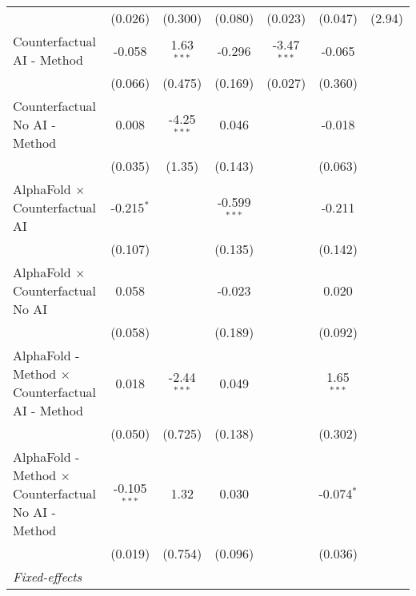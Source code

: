 \begin{tabular}{lcccccc}
                                                              & (0.026)        & (0.300)       & (0.080)        & (0.023)        & (0.047)      & (2.94)\\   
   Counterfactual AI - Method                                 & -0.058         & 1.63$^{***}$  & -0.296         & -3.47$^{***}$  & -0.065       &   \\   
                                                              & (0.066)        & (0.475)       & (0.169)        & (0.027)        & (0.360)      &   \\   
   Counterfactual No AI - Method                              & 0.008          & -4.25$^{***}$ & 0.046          &                & -0.018       &   \\   
                                                              & (0.035)        & (1.35)        & (0.143)        &                & (0.063)      &   \\   
   AlphaFold $\times$ Counterfactual AI                       & -0.215$^{*}$   &               & -0.599$^{***}$ &                & -0.211       &   \\   
                                                              & (0.107)        &               & (0.135)        &                & (0.142)      &   \\   
   AlphaFold $\times$ Counterfactual No AI                    & 0.058          &               & -0.023         &                & 0.020        &   \\   
                                                              & (0.058)        &               & (0.189)        &                & (0.092)      &   \\   
   AlphaFold - Method $\times$ Counterfactual AI - Method     & 0.018          & -2.44$^{***}$ & 0.049          &                & 1.65$^{***}$ &   \\   
                                                              & (0.050)        & (0.725)       & (0.138)        &                & (0.302)      &   \\   
   AlphaFold - Method $\times$ Counterfactual No AI - Method  & -0.105$^{***}$ & 1.32          & 0.030          &                & -0.074$^{*}$ &   \\   
                                                              & (0.019)        & (0.754)       & (0.096)        &                & (0.036)      &   \\   
   \midrule
   \emph{Fixed-effects}\\

\end{tabular}
